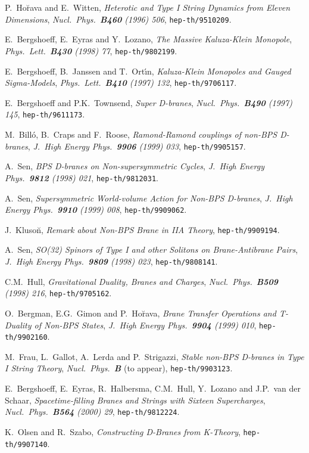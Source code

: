 \documentclass[12pt,a4paper]{article}
\begin{document}
\begin{thebibliography}{99}
P.~Ho\u{r}ava and E.~Witten, {\sl Heterotic and Type I String
Dynamics from Eleven Dimensions}, {\it Nucl.~Phys.~{\bf B460}
(1996) 506}, {\tt hep-th/9510209}.

E.~Bergshoeff, E.~Eyras and Y.~Lozano, {\sl The Massive
Kaluza-Klein Monopole}, {\it Phys.~Lett.~{\bf B430} (1998) 77},
{\tt hep-th/9802199}.


E.~Bergshoeff, B.~Janssen and T.~Ort\'{\i}n, {\sl Kaluza-Klein
Monopoles and Gauged Sigma-Models}, {\it Phys.~Lett.~{\bf B410}
(1997) 132}, {\tt hep-th/9706117}.


E.~Bergshoeff and P.K.~Townsend, {\sl Super D-branes},
{\it Nucl.~Phys.~{\bf B490} (1997) 145},
{\tt hep-th/9611173}.

M.~Bill\'o, B.~Craps and F.~Roose, {\sl Ramond-Ramond couplings
of non-BPS D-branes}, 
{\it J.~High Energy Phys.~{\bf 9906} (1999) 033},
{\tt hep-th/9905157}.

A.~Sen, {\sl BPS D-branes on Non-supersymmetric Cycles}, 
{\it J.~High Energy Phys.~{\bf 9812} (1998)
021}, {\tt hep-th/9812031}.

A.~Sen, {\sl Supersymmetric World-volume Action for Non-BPS
D-branes}, 
{\it J.~High Energy Phys.~{\bf 9910} (1999) 008},
{\tt hep-th/9909062}.

J.~Kluso\u{n}, {\sl Remark about Non-BPS Brane in IIA Theory},
{\tt hep-th/9909194}.


A.~Sen, {\sl SO(32) Spinors of Type I and other Solitons on
Brane-Antibrane Pairs}, {\it J.~High Energy Phys.~{\bf 9809}
(1998) 023}, {\tt hep-th/9808141}.

C.M.~Hull, {\sl Gravitational Duality, Branes and Charges}, 
{\it Nucl.~Phys.~{\bf B509} (1998) 216},
{\tt hep-th/9705162}.

O.~Bergman, E.G.~Gimon and P.~Ho\u{r}ava, {\sl Brane Transfer
Operations and T-Duality of Non-BPS States},
{\it J.~High Energy Phys.~{\bf 9904} (1999) 010}, 
{\tt hep-th/9902160}.

M.~Frau, L.~Gallot, A.~Lerda and P.~Strigazzi, {\sl Stable non-BPS
D-branes in Type I String Theory}, 
{\it Nucl.~Phys.~{\bf B}} (to appear), {\tt hep-th/9903123}.


E.~Bergshoeff, E.~Eyras, R.~Halbersma, C.M.~Hull, Y.~Lozano and
J.P.~van der Schaar, {\sl Spacetime-filling Branes and Strings with
Sixteen Supercharges}, {\it Nucl.~Phys.~{\bf B564} (2000) 29}, 
{\tt hep-th/9812224}.

K.~Olsen and R.~Szabo, {\sl Constructing D-Branes from K-Theory},
{\tt hep-th/9907140}.



\end{thebibliography}


 
\end{document}
